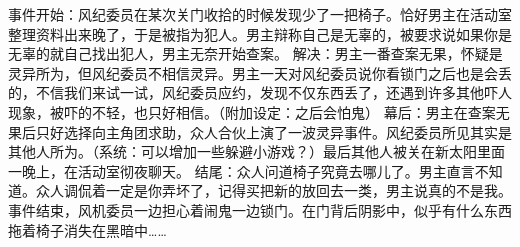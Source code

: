 \hypertarget{fengjirichang}{}
事件开始：风纪委员在某次关门收拾的时候发现少了一把椅子。恰好男主在活动室整理资料出来晚了，于是被指为犯人。男主辩称自己是无辜的，被要求说如果你是无辜的就自己找出犯人，男主无奈开始查案。
解决：男主一番查案无果，怀疑是灵异所为，但风纪委员不相信灵异。男主一天对风纪委员说你看锁门之后也是会丢的，不信我们来试一试，风纪委员应约，发现不仅东西丢了，还遇到许多其他吓人现象，被吓的不轻，也只好相信。（附加设定：之后会怕鬼）
幕后：男主在查案无果后只好选择向主角团求助，众人合伙上演了一波灵异事件。风纪委员所见其实是其他人所为。（系统：可以增加一些躲避小游戏？）最后其他人被关在新太阳里面一晚上，在活动室彻夜聊天。
结尾：众人问道椅子究竟去哪儿了。男主直言不知道。众人调侃着一定是你弄坏了，记得买把新的放回去一类，男主说真的不是我。事件结束，风机委员一边担心着闹鬼一边锁门。在门背后阴影中，似乎有什么东西拖着椅子消失在黑暗中……
